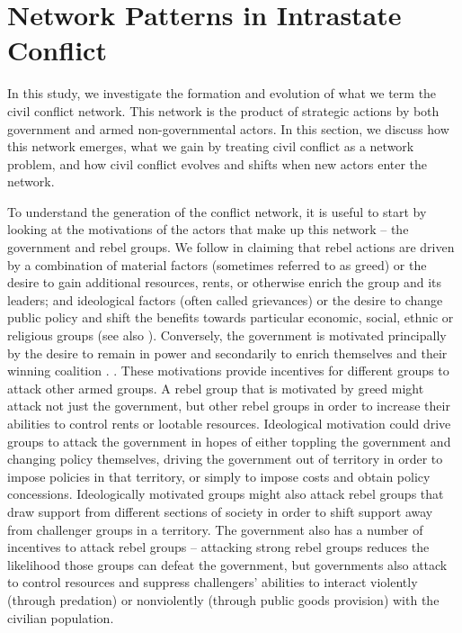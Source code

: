 \section*{Network Patterns in Intrastate Conflict}

In this study, we investigate the formation and evolution of what we term the civil conflict network. This network is the product of strategic actions by both government and armed non-governmental actors. In this section, we discuss how this network emerges, what we gain by treating civil conflict as a network problem, and how civil conflict evolves and shifts when new actors enter the network.

To understand the generation of the conflict network, it is useful to start by looking at the motivations of the actors that make up this network -- the government and rebel groups. We follow \citet{collier:hoeffler:2004} in claiming that rebel actions are driven by a combination of material factors (sometimes referred to as greed) or the desire to gain additional resources, rents, or otherwise enrich the group and its leaders; and ideological factors (often called grievances) or the desire to change public policy and shift the benefits towards particular economic, social, ethnic or religious groups (see also \citet{gurr:1970, regan:norton:2005, bodea:elbadawi:2007}). Conversely, the government is motivated principally by the desire to remain in power and secondarily to enrich themselves and their winning coalition \citet{bdm:etal:2005,goemans:2000,acemoglu:robinson:2001}.
 .
These motivations provide incentives for different groups to attack other armed groups. A rebel group that is motivated by greed might attack not just the government, but other rebel groups in order to increase their abilities to control rents or lootable resources. Ideological motivation could drive groups to attack the government in hopes of either toppling the government and changing policy themselves, driving the government out of territory in order to impose policies in that territory, or simply to impose costs and obtain policy concessions. Ideologically motivated groups might also attack rebel groups that draw support from different sections of society in order to shift support away from challenger groups in a territory. The government also has a number of incentives to attack rebel groups -- attacking strong rebel groups reduces the likelihood those groups can defeat the government, but governments also attack to control resources and suppress challengers' abilities to interact violently (through predation) or nonviolently (through public goods provision) with the civilian population. 

